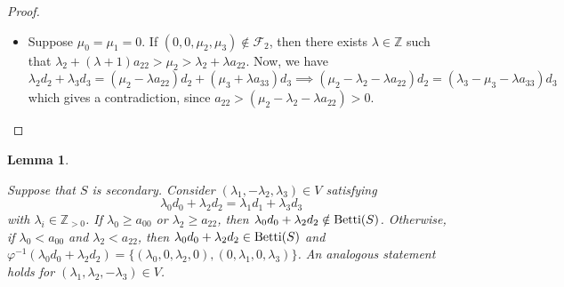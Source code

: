 \documentclass[12pt]{article}
\newtheorem{lemma}[thm]{Lemma}
\theoremstyle{remark}
\begin{document}
\begin{proof}
\begin{itemize}
    If $\mu_3 \geq \lambda_3$, we proceed analogously; therefore, suppose that $\mu_2 < \lambda_2$ and $\mu_3 < \lambda_3$. We have 
    \begin{equation}\label{lemma_catenary_lambda1latter_secondary_eq1}
        \lambda_0d_0 = (\mu_1-\lambda_1)d_1 + \mu_2d_2 + \mu_3d_3. 
    \end{equation} 
     By Lemma \ref{lemma_procedure_1}, no cube labeled with an element of the Ap{\'e}ry set is in the region associated to $(\mu_1 - \lambda_1,\mu_2,\mu_3)$. If $(\mu_1 - \lambda_1) \leq 0$, this gives a contradiction with the fact $[[0,\lambda_2-1,\lambda_3-1]] \in T$, which holds since $(-\lambda_1,\lambda_2,\lambda_3) \in V$. Hence $(\mu_1 - \lambda_1) > 0$, which gives $\lambda_0 \geq a_{00}$. If $\lambda_0 = a_{00}$, then $\mu_2 = \mu_3 = 0$ and $\mu_1 = \lambda_1 + a_{11}$, since $\varphi^{-1}(a_{00}d_0) = \{(a_{00},0,0,0),(0,a_{11},0,0)\}$. This gives $(\mu_0,\mu_1,\mu_2,\mu_3) \in \mathcal{F}_1$, so suppose $\lambda_0 > a_{00}$. We have
    \begin{equation}
        (\lambda_0-a_{00})d_0 = (\mu_1-\lambda_1-a_{11})d_1 + \mu_2d_2 + \mu_3d_3. 
    \end{equation}
    Now, we can repeat the same argument used for \eqref{lemma_catenary_lambda1latter_secondary_eq1} to eventually obtain a contradiction or $(\mu_0,\mu_1,\mu_2,\mu_3) \in \mathcal{F}_1$. 
    
    \item 
    Suppose $\mu_0 =\mu_1 = 0$. If $(0,0,\mu_2,\mu_3) \notin \mathcal{F}_2$, then there exists $\lambda \in \mathbb{Z}$ such that $ \lambda_2  + (\lambda+1) a_{22} > \mu_2 > \lambda_2  + \lambda a_{22}$. Now, we have
    \begin{equation}
        \lambda_2d_2 + \lambda_3d_3 = (\mu_2 - \lambda a_{22})d_2 + (\mu_3 + \lambda a_{33})d_3 \implies (\mu_2 - \lambda_2 - \lambda a_{22} )d_2 = (\lambda_3 - \mu_3 - \lambda a_{33})d_3
    \end{equation}
    which gives a contradiction, since $ a_{22} > (\mu_2 - \lambda_2  - \lambda a_{22}) > 0$. \qedhere
     \end{itemize}
\end{proof}


\begin{lemma}\label{lemma_catenary_lambda23_secondary}

    Suppose that $S$ is secondary.  Consider $(\lambda_1,-\lambda_2,\lambda_3) \in V$ satisfying
    $$ \lambda_0d_0 + \lambda_2d_2 = \lambda_1d_1 + \lambda_3d_3$$
    with $\lambda_i \in \mathbb{Z}_{>0}$. If $\lambda_0 \geq a_{00}$ or $\lambda_2 \geq a_{22}$, then $\lambda_0d_0 + \lambda_2d_2 \notin \textup{Betti}(S)$.
    Otherwise, if $\lambda_0 < a_{00}$ and $\lambda_2 < a_{22}$, then $\lambda_0d_0 + \lambda_2d_2 \in \textup{Betti}(S)$ and $\varphi^{-1}(\lambda_0d_0 + \lambda_2d_2) = \{(\lambda_0,0,\lambda_2,0),(0,\lambda_1,0,\lambda_3)\}$. An analogous statement holds for $(\lambda_1,\lambda_2,-\lambda_3) \in V$.
\end{lemma}
\end{document}
